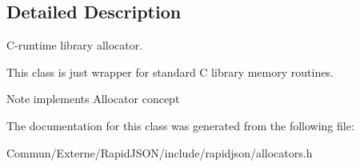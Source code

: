 \subsection{Detailed Description}
C-\/runtime library allocator. 

This class is just wrapper for standard C library memory routines. \begin{DoxyNote}{Note}
implements Allocator concept 
\end{DoxyNote}


The documentation for this class was generated from the following file\+:\begin{DoxyCompactItemize}
\item 
Commun/\+Externe/\+Rapid\+J\+S\+O\+N/include/rapidjson/allocators.\+h\end{DoxyCompactItemize}
